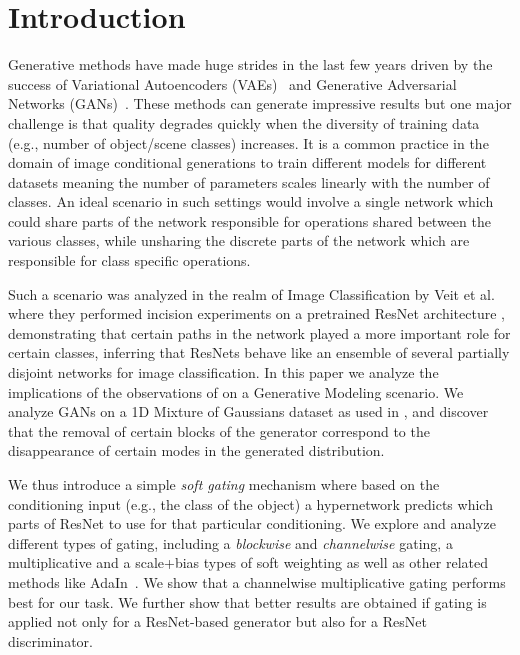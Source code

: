 \section{Introduction}
Generative methods have made huge strides in the last few years driven by the success of Variational Autoencoders (VAEs)~\cite{kingma2013auto} and Generative Adversarial Networks (GANs)~\cite{goodfellow2014generative}. 
These methods can generate impressive results but one major challenge is that quality degrades quickly when the diversity of training data (e.g., number of object/scene classes) increases. 
It is a common practice in the domain of image conditional generations to train different models for different datasets \cite{goodfellow2014generative,isola2016image2image,karras2017progressive,zhu2017toward,zhu2017unpaired,wang2018video} meaning the number of parameters scales linearly with the number of classes. 
An ideal scenario in such settings would involve a single network which could share parts of the network responsible for operations shared between the various classes, while unsharing the discrete parts of the network which are responsible for class specific operations.

Such a scenario was analyzed in the realm of Image Classification by Veit et al.~\cite{veit2016residual} where they performed incision experiments on a pretrained ResNet architecture \cite{he2016deep}, demonstrating that certain paths in the network played a more important role for certain classes, inferring that ResNets behave like an ensemble of several partially disjoint networks for image classification. 
In this paper we analyze the implications of the observations of \cite{veit2016residual} on a Generative Modeling scenario. 
We analyze GANs on a 1D Mixture of Gaussians dataset as used in \cite{ghosh2017multi}, and discover that the removal of certain blocks of the generator correspond to the disappearance of certain modes in the generated distribution.

We thus introduce a simple {\em soft gating} mechanism where based on the conditioning input (e.g., the class of the object) a hypernetwork predicts which parts of ResNet to use for that particular conditioning.
We explore and analyze different types of gating, including a {\em blockwise} and {\em channelwise} gating, a multiplicative and a scale+bias types of soft weighting as well as other related methods like AdaIn~\cite{huang2017arbitrary,huang2018multimodal}. We show that a channelwise multiplicative gating performs best for our task. We further show that better results are obtained if gating is applied not only for a ResNet-based generator but also for a ResNet discriminator.


